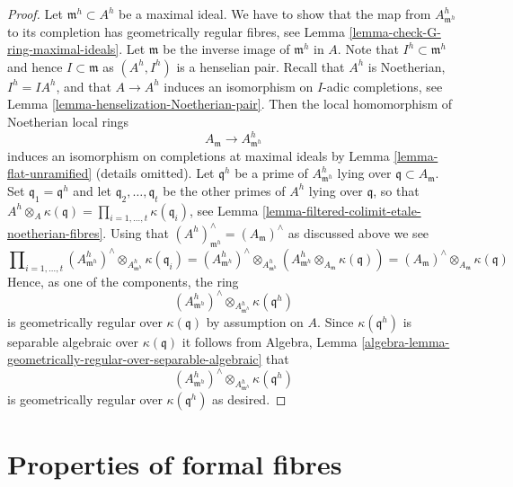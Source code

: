 \begin{proof}
Let $\mathfrak m^h \subset A^h$ be a maximal ideal. We have to show
that the map from $A^h_{\mathfrak m^h}$ to its completion has
geometrically regular fibres, see
Lemma \ref{lemma-check-G-ring-maximal-ideals}.
Let $\mathfrak m$ be the inverse image of $\mathfrak m^h$ in $A$.
Note that $I^h \subset \mathfrak m^h$ and hence $I \subset \mathfrak m$
as $(A^h, I^h)$ is a henselian pair. Recall that $A^h$ is Noetherian,
$I^h = IA^h$, and that $A \to A^h$ induces an isomorphism on
$I$-adic completions, see
Lemma \ref{lemma-henselization-Noetherian-pair}.
Then the local homomorphism of Noetherian local rings
$$
A_\mathfrak m \to A^h_{\mathfrak m^h}
$$
induces an isomorphism on completions at maximal ideals by
Lemma \ref{lemma-flat-unramified} (details omitted).
Let $\mathfrak q^h$ be a prime of $A^h_{\mathfrak m^h}$ lying
over $\mathfrak q \subset A_\mathfrak m$.
Set $\mathfrak q_1 = \mathfrak q^h$
and let $\mathfrak q_2, \ldots, \mathfrak q_t$
be the other primes of $A^h$ lying over $\mathfrak q$, so that
$A^h \otimes_A \kappa(\mathfrak q) =
\prod\nolimits_{i = 1, \ldots, t} \kappa(\mathfrak q_i)$, see
Lemma \ref{lemma-filtered-colimit-etale-noetherian-fibres}.
Using that $(A^h)_{\mathfrak m^h}^\wedge = (A_\mathfrak m)^\wedge$
as discussed above we see
$$
\prod\nolimits_{i = 1, \ldots, t}
(A^h_{\mathfrak m^h})^\wedge \otimes_{A^h_{\mathfrak m^h}}
\kappa(\mathfrak q_i) =
(A^h_{\mathfrak m^h})^\wedge \otimes_{A^h_{\mathfrak m^h}}
(A^h_{\mathfrak m^h} \otimes_{A_{\mathfrak m}} \kappa(\mathfrak q)) =
(A_{\mathfrak m})^\wedge \otimes_{A_{\mathfrak m}} \kappa(\mathfrak q)
$$
Hence, as one of the components, the ring
$$
(A^h_{\mathfrak m^h})^\wedge \otimes_{A^h_{\mathfrak m^h}}
\kappa(\mathfrak q^h)
$$
is geometrically regular over $\kappa(\mathfrak q)$ by assumption on $A$.
Since $\kappa(\mathfrak q^h)$ is separable algebraic over
$\kappa(\mathfrak q)$
it follows from Algebra, Lemma
\ref{algebra-lemma-geometrically-regular-over-separable-algebraic} that
$$
(A^h_{\mathfrak m^h})^\wedge \otimes_{A^h_{\mathfrak m^h}}
\kappa(\mathfrak q^h)
$$
is geometrically regular over $\kappa(\mathfrak q^h)$ as desired.
\end{proof}







\section{Properties of formal fibres}
\label{section-properties-formal-fibres}

